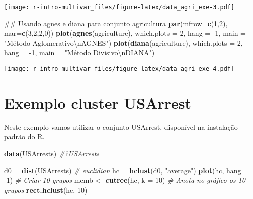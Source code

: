 \documentclass[]{book}
\newenvironment{Shaded}{\begin{snugshade}}{\end{snugshade}}
\newcommand{\KeywordTok}[1]{\textcolor[rgb]{0.13,0.29,0.53}{\textbf{{#1}}}}
\newcommand{\DataTypeTok}[1]{\textcolor[rgb]{0.13,0.29,0.53}{{#1}}}
\newcommand{\DecValTok}[1]{\textcolor[rgb]{0.00,0.00,0.81}{{#1}}}
\newcommand{\CharTok}[1]{\textcolor[rgb]{0.31,0.60,0.02}{{#1}}}
\newcommand{\StringTok}[1]{\textcolor[rgb]{0.31,0.60,0.02}{{#1}}}
\newcommand{\CommentTok}[1]{\textcolor[rgb]{0.56,0.35,0.01}{\textit{{#1}}}}
\newcommand{\NormalTok}[1]{{#1}}
\begin{document}
\texttt{[image: r-intro-multivar\_files/figure-latex/data\_agri\_exe-3.pdf]}

\begin{Shaded}
\begin{Highlighting}[]
\NormalTok{## Usando agnes e diana para conjunto agricultura}
\KeywordTok{par}\NormalTok{(}\DataTypeTok{mfrow=}\KeywordTok{c}\NormalTok{(}\DecValTok{1}\NormalTok{,}\DecValTok{2}\NormalTok{), }\DataTypeTok{mar=}\KeywordTok{c}\NormalTok{(}\DecValTok{3}\NormalTok{,}\DecValTok{2}\NormalTok{,}\DecValTok{2}\NormalTok{,}\DecValTok{0}\NormalTok{))}
\KeywordTok{plot}\NormalTok{(}\KeywordTok{agnes}\NormalTok{(agriculture), }\DataTypeTok{which.plots =} \DecValTok{2}\NormalTok{, }\DataTypeTok{hang =} \NormalTok{-}\DecValTok{1}\NormalTok{,}
     \DataTypeTok{main =} \StringTok{"Método Aglomerativo}\CharTok{\textbackslash{}n}\StringTok{AGNES"}\NormalTok{)}
\KeywordTok{plot}\NormalTok{(}\KeywordTok{diana}\NormalTok{(agriculture), }\DataTypeTok{which.plots =} \DecValTok{2}\NormalTok{, }\DataTypeTok{hang =} \NormalTok{-}\DecValTok{1}\NormalTok{,}
     \DataTypeTok{main =} \StringTok{"Método Divisivo}\CharTok{\textbackslash{}n}\StringTok{DIANA"}\NormalTok{)}
\end{Highlighting}
\end{Shaded}

\texttt{[image: r-intro-multivar\_files/figure-latex/data\_agri\_exe-4.pdf]}

\section{Exemplo cluster USArrest}\label{exemplo-cluster-usarrest}

Neste exemplo vamos utilizar o conjunto USArrest, disponível na
instalação padrão do R.

\begin{Shaded}
\begin{Highlighting}[]
\KeywordTok{data}\NormalTok{(USArrests)}
\CommentTok{#?USArrests}

\NormalTok{d0 =}\StringTok{ }\KeywordTok{dist}\NormalTok{(USArrests) }\CommentTok{# euclidian}
\NormalTok{hc =}\StringTok{ }\KeywordTok{hclust}\NormalTok{(d0, }\StringTok{"average"}\NormalTok{)}
\KeywordTok{plot}\NormalTok{(hc, }\DataTypeTok{hang =} \NormalTok{-}\DecValTok{1}\NormalTok{)}
\CommentTok{# Criar 10 grupos}
\NormalTok{memb <-}\StringTok{ }\KeywordTok{cutree}\NormalTok{(hc, }\DataTypeTok{k =} \DecValTok{10}\NormalTok{)}
\CommentTok{# Anota no gráfico os 10 grupos}
\KeywordTok{rect.hclust}\NormalTok{(hc, }\DecValTok{10}\NormalTok{)}
\end{Highlighting}
\end{Shaded}
\end{document}
